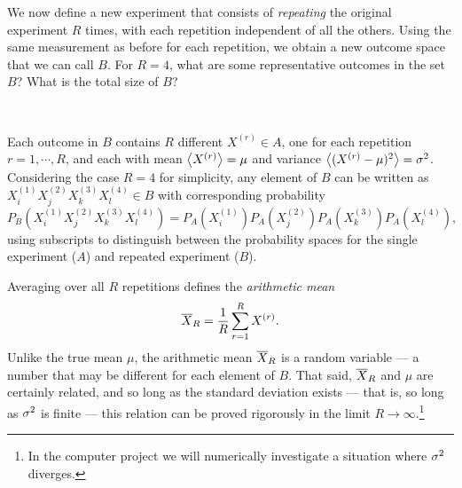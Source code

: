 We now define a new experiment that consists of \textit{repeating} the original experiment $R$ times, with each repetition independent of all the others.
Using the same measurement as before for each repetition, we obtain a new outcome space that we can call $B$.
For $R = 4$, what are some representative outcomes in the set $B$?
What is the total size of $B$?
\begin{mdframed}
  \ \\[100 pt]
\end{mdframed}

Each outcome in $B$ contains $R$ different $X^{(r)} \in A$, one for each repetition $r = 1, \cdots, R$, and each with mean $\left\langle X^{(r)} \right\rangle = \mu$ and variance $\left\langle (X^{(r)} - \mu)^2 \right\rangle = \sigma^2$.
Considering the case $R = 4$ for simplicity, any element of $B$ can be written as $X_i^{(1)} X_j^{(2)} X_k^{(3)} X_l^{(4)} \in B$ with corresponding probability
\begin{equation*}
  P_B\left(X_i^{(1)} X_j^{(2)} X_k^{(3)} X_l^{(4)}\right) = P_A\left(X_i^{(1)}\right) P_A\left(X_j^{(2)}\right) P_A\left(X_k^{(3)}\right) P_A\left(X_l^{(4)}\right),
\end{equation*}
using subscripts to distinguish between the probability spaces for the single experiment ($A$) and repeated experiment ($B$).

Averaging over all $R$ repetitions defines the \textit{arithmetic mean}
\begin{equation}
  \label{eq:ave}
  \overline X_R = \frac{1}{R} \sum_{r = 1}^R X^{(r)}.
\end{equation}
Unlike the true mean $\mu$, the arithmetic mean $\overline X_R$ is a random variable --- a number that may be different for each element of $B$.
That said, $\overline X_R$ and $\mu$ are certainly related, and so long as the standard deviation exists --- that is, so long as $\sigma^2$ is finite --- this relation can be proved rigorously in the limit $R \to \infty$.\footnote{In the computer project we will numerically investigate a situation where $\sigma^2$ diverges.}

